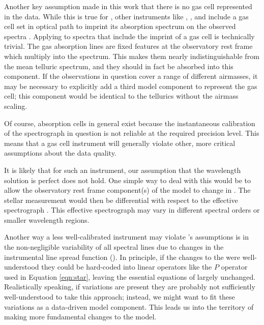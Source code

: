 \documentclass[modern]{aastex62}
\begin{document}
Another key assumption made in this work that there is no gas cell represented in the data. 
While this is true for \HARPS, other instruments like , , and  include a gas cell set in optical path to imprint its absorption spectrum on the observed spectra . 
Applying \wobble to spectra that include the imprint of a gas cell is technically trivial. 
The gas absorption lines are fixed features at the observatory rest frame which multiply into the spectrum. 
This makes them nearly indistinguishable from the mean telluric spectrum, and they should in fact be absorbed into this component. 
If the observations in question cover a range of different airmasses, it may be necessary to explicitly add a third model component to represent the gas cell; this component would be identical to the tellurics without the airmass scaling. 

Of course, absorption cells in general exist because the instantaneous calibration of the spectrograph in question is not reliable at the required \RV precision level. 
This means that a gas cell instrument will generally violate other, more critical assumptions about the data quality. 

It is likely that for such an instrument, our assumption that the wavelength solution is perfect does not hold. 
One simple way to deal with this would be to allow the observatory rest frame component(s) of the model to change in \RV. 
The stellar \RV measurement would then be differential with respect to the effective spectrograph \RV. 
This effective spectrograph \RV may vary in different spectral orders or smaller wavelength regions.  

Another way a less well-calibrated instrument may violate \wobble's assumptions is in the non-negligible variability of all spectral lines due to changes in the instrumental line spread function (\LSF). 
In principle, if the changes to the \LSF were well-understood they could be hard-coded into linear operators like the $P$ operator used in Equation \ref{eqn:star}, leaving the essential equations of \wobble largely unchanged. 
Realistically speaking, if \LSF variations are present they are probably not sufficiently well-understood to take this approach; instead, we might want to fit these variations as a data-driven model component. 
This leads us into the territory of making more fundamental changes to the \wobble model.
\end{document}
